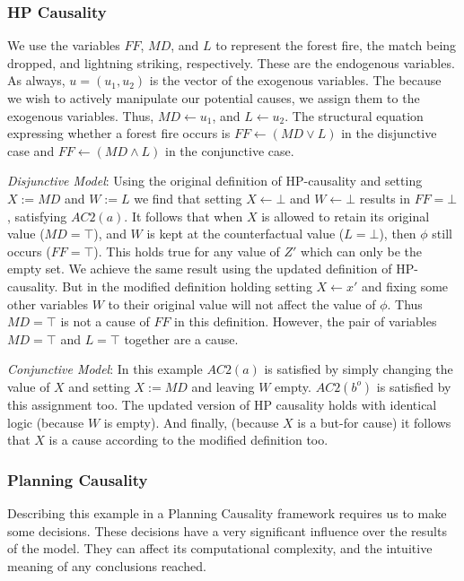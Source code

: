 \documentclass{article}
\theoremstyle{plain}
\theoremstyle{definition}
\begin{document}
\subsubsection*{HP Causality}
We use the variables $FF$, $MD$, and $L$ to represent the forest fire, the match being dropped, and lightning striking, respectively. These are the endogenous variables. As always, $u=(u_1, u_2)$ is the vector of the exogenous variables. The because we wish to actively manipulate our potential causes, we assign them to the exogenous variables. Thus, $MD \leftarrow u_1$, and $L \leftarrow u_2$. The structural equation expressing whether a forest fire occurs is $FF\leftarrow(MD \lor L)$ in the disjunctive case and $FF \leftarrow (MD \land L)$ in the conjunctive case.

\textit{Disjunctive Model}: Using the original definition of HP-causality and setting $X:=MD$ and $W:=L$ we find that setting $X \leftarrow \bot$ and $W \leftarrow \bot$ results in $FF=\bot$, satisfying $AC2(a)$. It follows that when $X$  is allowed to retain its original value ($MD=\top$), and $W$ is kept at the counterfactual value ($L=\bot$), then $\phi$ still occurs ($FF=\top$). This holds true for any value of $Z'$ which can only be the empty set. We achieve the same result using the updated definition of HP-causality. But in the modified definition holding setting $X \leftarrow x'$ and fixing some other variables $W$ to their original value will not affect the value of $\phi$. Thus $MD=\top$ is not a cause of $FF$ in this definition. However, the pair of variables $MD=\top$ and $L=\top$ together are a cause.

\textit{Conjunctive Model}: In this example $AC2(a)$ is satisfied by simply changing the value of $X$ and setting $X:=MD$ and leaving $W$ empty. $AC2(b^o)$ is satisfied by this assignment too. The updated version of HP causality holds with identical logic (because $W$ is empty). And finally, (because $X$ is a but-for cause) it follows that $X$ is a cause according to the modified definition too.

\subsubsection*{Planning Causality}
Describing this example in a Planning Causality framework requires us to make some decisions. These decisions have a very significant influence over the results of the model. They can affect its computational complexity, and the intuitive meaning of any conclusions reached.
\end{document}
